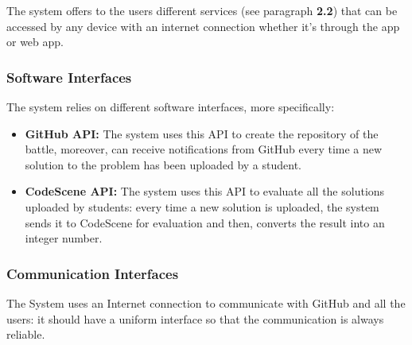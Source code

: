 \documentclass{article}
\begin{document}
The system offers to the users different services (see paragraph \textbf{2.2}) that can be accessed by any device with an internet connection whether it's through the app or web app.
                            
\subsubsection{Software Interfaces}
The system relies on different software interfaces, more specifically:
\begin{itemize}
    \item \textbf{GitHub API:} The system uses this API to create the repository of the battle, moreover, can receive notifications from GitHub every time a new solution to the problem has been uploaded by a student.
    \item \textbf{CodeScene API:} The system uses this API to evaluate all the solutions uploaded by students: every time a new solution is uploaded, the system sends it to CodeScene for evaluation and then, converts the result into an integer number.
\end{itemize}

\subsubsection{Communication Interfaces}
The System uses an Internet connection to communicate with GitHub and all the users: it should have a uniform interface so that the communication is always reliable.
\end{document}
